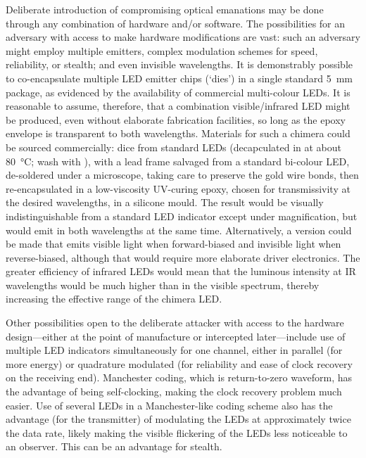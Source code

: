 \documentclass[a4paper,twoside,11pt]{book}
\begin{document}
Deliberate introduction of compromising optical emanations may be done through
any combination of hardware and/or software. The possibilities for an adversary
with access to make hardware modifications are vast: such an adversary might
employ multiple emitters, complex modulation schemes for speed, reliability, or
stealth; and even invisible wavelengths. It is demonstrably possible to
co-encapsulate multiple LED emitter chips (`dies') in a single standard
\SI{5}{\milli\metre} package, as evidenced by the availability of commercial
multi-colour LEDs. It is reasonable to assume, therefore, that a combination
visible/infrared LED might be produced, even without elaborate fabrication
facilities, so long as the epoxy envelope is transparent to both wavelengths.
Materials for such a chimera could be sourced commercially: dice from standard
LEDs (decapculated in  at about \SI{80}{\celsius}; wash with
), with a lead frame salvaged from a standard bi-colour LED,
de-soldered under a microscope, taking care to preserve the gold wire bonds,
then re-encapsulated in a low-viscosity UV-curing epoxy, chosen for
transmissivity at the desired wavelengths, in a silicone mould. The result
would be visually indistinguishable from a standard LED indicator except under
magnification, but would emit in both wavelengths at the same time.
Alternatively, a version could be made that emits visible light when
forward-biased and invisible light when reverse-biased, although that would
require more elaborate driver electronics. The greater efficiency of infrared
LEDs would mean that the luminous intensity at IR wavelengths would be much
higher than in the visible spectrum, thereby increasing the effective range of
the chimera LED.

Other possibilities open to the deliberate attacker with access to the hardware
design---either at the point of manufacture or intercepted later---include use
of multiple LED indicators simultaneously for one channel, either in parallel
(for more energy) or quadrature modulated (for reliability and ease of clock
recovery on the receiving end). Manchester coding, which is return-to-zero
waveform, has the advantage of being self-clocking, making the clock recovery
problem much easier. Use of several LEDs in a Manchester-like coding scheme
also has the advantage (for the transmitter) of modulating the LEDs at
approximately twice the data rate, likely making the visible flickering of the
LEDs less noticeable to an observer. This can be an advantage for stealth.
\end{document}
